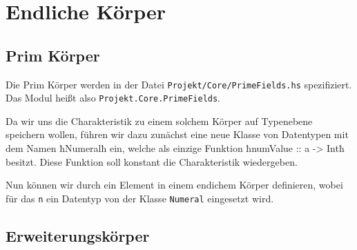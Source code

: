 \section{Endliche Körper}
\subsection{Prim Körper}
Die Prim Körper werden in der Datei \texttt{Projekt/Core/PrimeFields.hs}
spezifiziert. Das Modul heißt also \texttt{Projekt.Core.PrimeFields}.

Da wir uns die Charakteristik zu einem solchem Körper auf Typenebene speichern
wollen, führen wir dazu zunächst eine neue Klasse von Datentypen mit dem Namen
ħNumeralħ ein, welche als einzige Funktion 
ħnumValue :: a -> Intħ besitzt. Diese Funktion soll konstant 
die Charakteristik wiedergeben.

Nun können wir durch
ein Element in einem endichem Körper definieren, wobei für das \texttt{n} ein
Datentyp von der Klasse \texttt{Numeral} eingesetzt wird.


\subsection{Erweiterungskörper}


